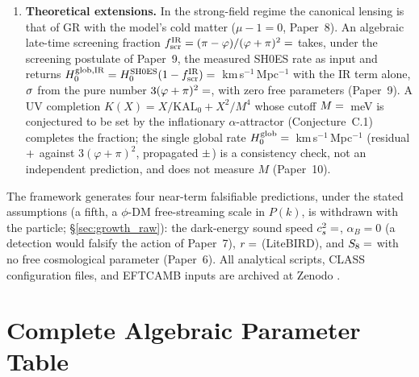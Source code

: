 \documentclass[12pt,a4paper]{article}
\newcommand{\phiG}{\varphi}
\newcommand{\KAL}{\mathrm{KAL}_0}
\newcommand{\fscr}{f_{\mathrm{scr}}}
\newcommand{\alphaB}{\alpha_B}
\begin{document}
\begin{enumerate}[leftmargin=*,itemsep=2pt]
\item \textbf{Theoretical extensions.} In the strong-field regime the canonical
  lensing is that of GR with the model's cold matter ($\mu-1=0$, Paper~8). An algebraic late-time screening fraction
  $\fscr^{\rm IR}=(\pi-\phiG)/(\phiG+\pi)^2=\val{F_SCREEN_IR_d4}$ takes, under the screening
  postulate of Paper~9, the measured SH0ES rate as input and returns
  $H_0^{\rm glob,IR}=H_0^{\rm SH0ES}(1-\fscr^{\rm IR})=\val{p9_sh0es_glob_IR}$~km\,s$^{-1}$\,Mpc$^{-1}$
  with the IR term alone, $\val{p9_sh0es_sig_IR}\sigma$ from the pure number $3(\phiG+\pi)^2=\val{H0_ALG_d5}$, with
  zero free parameters (Paper~9). A UV completion $K(X)=X/\KAL+X^2/M^4$ whose cutoff
  $M=\val{M_meV_d2}$~meV is conjectured to be set by the inflationary $\alpha$-attractor
  (Conjecture~C.1) completes the fraction; the single global rate
  $H_0^{\rm glob}=\val{H0_GLOBAL_d5}$~km\,s$^{-1}$\,Mpc$^{-1}$ (residual $+\val{p9_hglob_residuo}$ against
  $3(\varphi+\pi)^2$, propagated $\pm\val{p9_hglob_sigma}$) is a consistency check, not an
  independent prediction, and does not measure $M$ (Paper~10).
\end{enumerate}

The framework generates four near-term falsifiable predictions, under the stated
assumptions (a fifth, a $\phi$-DM free-streaming scale in $P(k)$, is withdrawn
with the particle; \S\ref{sec:growth_raw}): the dark-energy sound speed $c_s^2 = \val{cs2_condensado_d6}$, $\alphaB = 0$ (a detection
would falsify the action of Paper~7), $r = \val{R_TENSOR_d6}$ (LiteBIRD), and $S_8 = \val{S8_leg_pred}$ with no
free cosmological parameter (Paper~6).
All analytical scripts, CLASS configuration files, and EFTCAMB inputs are archived
at Zenodo \citep{AlmeidaSSEE2026zenodo}.

\appendix
\section{Complete Algebraic Parameter Table}
\label{app:params}
\end{document}
